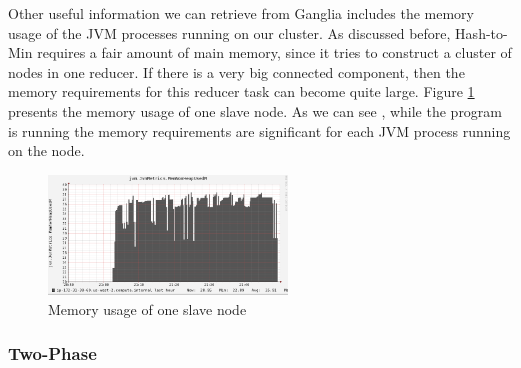 Other useful information we can retrieve from Ganglia includes the memory usage of the JVM processes running on our cluster. As discussed before, Hash-to-Min requires a fair amount of main memory, since it tries to construct a cluster of nodes in one reducer. If there is a very big connected component, then the memory requirements for this reducer task can become quite large. Figure \ref{fig:memory_usage} presents the memory usage of one slave node. As we can see , while the program is running the memory requirements are significant for each JVM process running on the node.

\begin{figure}[!h]
 \centering
    \includegraphics[width=15pc]{figures/memory_usage}
	\caption{Memory usage of one slave node}
    \label{fig:memory_usage}
\end{figure}

\subsubsection{Two-Phase}

